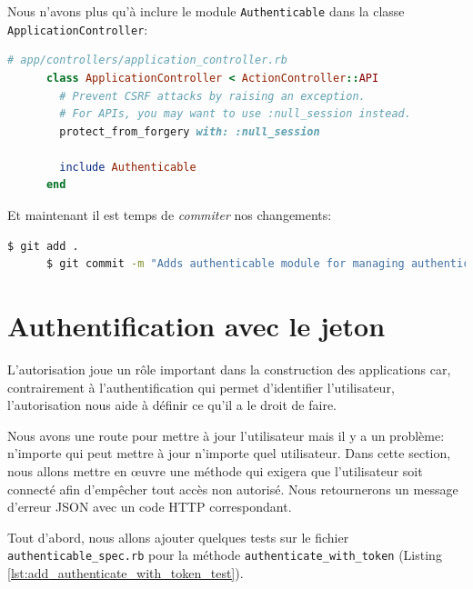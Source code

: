 \documentclass[]{report}
\begin{document}
    Nous n'avons plus qu'à inclure le module \verb|Authenticable| dans la classe \verb|ApplicationController|:


    \begin{scriptsize}
      \begin{lstlisting}[language=ruby]
      # app/controllers/application_controller.rb
      class ApplicationController < ActionController::API
        # Prevent CSRF attacks by raising an exception.
        # For APIs, you may want to use :null_session instead.
        protect_from_forgery with: :null_session

        include Authenticable
      end
      \end{lstlisting}
    \end{scriptsize}

    Et maintenant il est temps de \textit{commiter} nos changements:

    \begin{scriptsize}
      \begin{lstlisting}[language=bash]
      $ git add .
      $ git commit -m "Adds authenticable module for managing authentication methods"
      \end{lstlisting}
    \end{scriptsize}

  \section{Authentification avec le jeton}

    L'autorisation joue un rôle important dans la construction des applications car, contrairement à l'authentification qui permet d'identifier l'utilisateur, l'autorisation nous aide à définir ce qu'il a le droit de faire.

    Nous avons une route pour mettre à jour l'utilisateur mais il y a un problème: n'importe qui peut mettre à jour n'importe quel utilisateur. Dans cette section, nous allons mettre en œuvre une méthode qui exigera que l'utilisateur soit connecté afin d'empêcher tout accès non autorisé. Nous retournerons un message d'erreur JSON avec un code HTTP correspondant.

    Tout d'abord, nous allons ajouter quelques tests sur le fichier \verb|authenticable_spec.rb| pour la méthode \verb|authenticate_with_token| (Listing \ref{lst:add_authenticate_with_token_test}).
\end{document}
